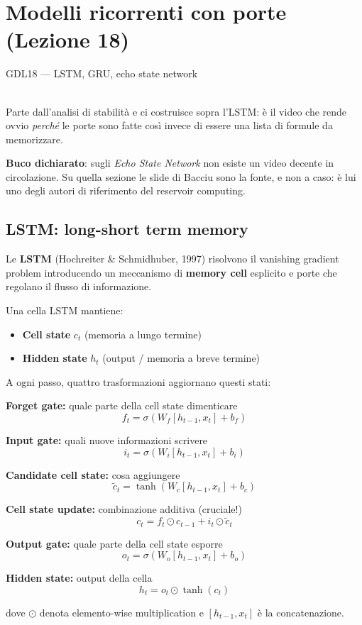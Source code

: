 \chapter{Modelli ricorrenti con porte (Lezione 18)}

\begin{risorsevideo}{GDL18 — LSTM, GRU, echo state network}

\medskip
{}\\
Parte dall'analisi di stabilità e ci costruisce sopra l'LSTM: è il video che rende ovvio \emph{perché} le porte sono fatte così invece di essere una lista di formule da memorizzare.

\medskip
\textbf{Buco dichiarato}: sugli \emph{Echo State Network} non esiste un video decente in circolazione. Su quella sezione le slide di Bacciu sono la fonte, e non a caso: è lui uno degli autori di riferimento del reservoir computing.
\end{risorsevideo}

\section{LSTM: long-short term memory}

Le \textbf{LSTM} (Hochreiter \& Schmidhuber, 1997) risolvono il vanishing gradient problem introducendo un meccanismo di \textbf{memory cell} esplicito e porte che regolano il flusso di informazione.

\begin{definition}
Una cella LSTM mantiene:
\begin{itemize}
\item \textbf{Cell state} $c_t$ (memoria a lungo termine)
\item \textbf{Hidden state} $h_t$ (output / memoria a breve termine)
\end{itemize}

A ogni passo, quattro trasformazioni aggiornano questi stati:

\textbf{Forget gate:} quale parte della cell state dimenticare
\[
f_t = \sigma(W_f [h_{t-1}, x_t] + b_f)
\]

\textbf{Input gate:} quali nuove informazioni scrivere
\[
i_t = \sigma(W_i [h_{t-1}, x_t] + b_i)
\]

\textbf{Candidate cell state:} cosa aggiungere
\[
\tilde{c}_t = \tanh(W_c [h_{t-1}, x_t] + b_c)
\]

\textbf{Cell state update:} combinazione additiva (cruciale!)
\[
c_t = f_t \odot c_{t-1} + i_t \odot \tilde{c}_t
\]

\textbf{Output gate:} quale parte della cell state esporre
\[
o_t = \sigma(W_o [h_{t-1}, x_t] + b_o)
\]

\textbf{Hidden state:} output della cella
\[
h_t = o_t \odot \tanh(c_t)
\]

dove $\odot$ denota elemento-wise multiplication e $[h_{t-1}, x_t]$ è la concatenazione.
\end{definition}

